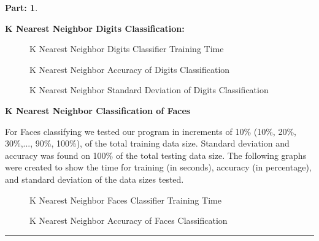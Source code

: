 \documentclass{article}
\theoremstyle{definition}
\def\fline{\rule{0.75\linewidth}{0.5pt}}
\newcommand{\finishline}{\begin{center}\fline\end{center}}
\newtheorem*{solution*}{Part: }
\newenvironment{solution}{\begin{solution*}}{{\finishline} \end{solution*}}
\begin{document}
\begin{solution}
\begin{newpage}
\end{newpage}

\item \textbf{K Nearest Neighbor Digits Classification:}
\begin{figure}[h!]
            \centering
            \item 
            \caption{K Nearest Neighbor Digits Classifier Training Time}
        \end{figure}
\item
\begin{figure}[h!]
            \centering
            \item 
            \caption{K Nearest Neighbor Accuracy of Digits Classification}
        \end{figure}
        
\item
\begin{figure}[h!]
            \centering
            \item 
            \caption{K Nearest Neighbor Standard Deviation of Digits Classification}
        \end{figure}

\begin{newpage}
\end{newpage}

\item \textbf{K Nearest Neighbor Classification of Faces}
\item For Faces classifying we tested our program in increments of 10\% (10\%, 20\%, 30\%,..., 90\%, 100\%), of the total training data size. Standard deviation and accuracy was found on 100\% of the total testing data size. The following graphs were created to show the time for training (in seconds), accuracy (in percentage), and standard deviation of the data sizes tested.

\begin{figure}[h!]
            \centering
            \item 
            \caption{K Nearest Neighbor Faces Classifier Training Time}
        \end{figure}
\item
\begin{figure}[h!]
            \centering
            \item 
            \caption{K Nearest Neighbor Accuracy of Faces Classification}
        \end{figure}
        

\end{solution}
\end{document}
